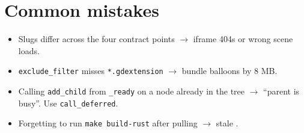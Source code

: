 \documentclass[11pt,a4paper,openany]{book}
\begin{document}
\chapter{Common mistakes}
\begin{itemize}
  \item Slugs differ across the four contract points $\rightarrow$
        iframe 404s or wrong scene loads.
  \item \texttt{exclude\_filter} misses \texttt{*.gdextension}
        $\rightarrow$ bundle balloons by 8 MB.
  \item Calling \texttt{add\_child} from \texttt{\_ready} on a node
        already in the tree $\rightarrow$ ``parent is busy''. Use
        \texttt{call\_deferred}.
  \item Forgetting to run \texttt{make build-rust} after pulling
        $\rightarrow$ stale .
\end{itemize}
\end{document}
